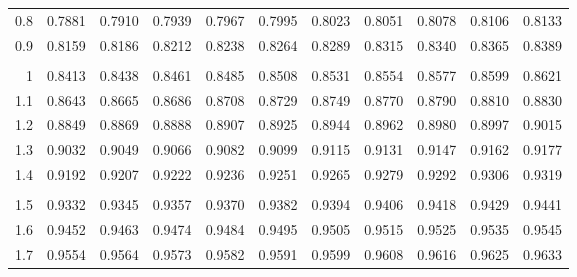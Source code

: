\begin{center}
\begin{tabular}{r|rrrrrrrrrr}
       0.8 &     0.7881 &     0.7910 &     0.7939 &     0.7967 &     0.7995 &     0.8023 &     0.8051 &     0.8078 &     0.8106 &     0.8133 \\

       0.9 &     0.8159 &     0.8186 &     0.8212 &     0.8238 &     0.8264 &     0.8289 &     0.8315 &     0.8340 &     0.8365 &     0.8389 \\

           &            &            &            &            &            &            &            &            &            &            \\

         1 &     0.8413 &     0.8438 &     0.8461 &     0.8485 &     0.8508 &     0.8531 &     0.8554 &     0.8577 &     0.8599 &     0.8621 \\

       1.1 &     0.8643 &     0.8665 &     0.8686 &     0.8708 &     0.8729 &     0.8749 &     0.8770 &     0.8790 &     0.8810 &     0.8830 \\

       1.2 &     0.8849 &     0.8869 &     0.8888 &     0.8907 &     0.8925 &     0.8944 &     0.8962 &     0.8980 &     0.8997 &     0.9015 \\

       1.3 &     0.9032 &     0.9049 &     0.9066 &     0.9082 &     0.9099 &     0.9115 &     0.9131 &     0.9147 &     0.9162 &     0.9177 \\

       1.4 &     0.9192 &     0.9207 &     0.9222 &     0.9236 &     0.9251 &     0.9265 &     0.9279 &     0.9292 &     0.9306 &     0.9319 \\

           &            &            &            &            &            &            &            &            &            &            \\

       1.5 &     0.9332 &     0.9345 &     0.9357 &     0.9370 &     0.9382 &     0.9394 &     0.9406 &     0.9418 &     0.9429 &     0.9441 \\

       1.6 &     0.9452 &     0.9463 &     0.9474 &     0.9484 &     0.9495 &     0.9505 &     0.9515 &     0.9525 &     0.9535 &     0.9545 \\

       1.7 &     0.9554 &     0.9564 &     0.9573 &     0.9582 &     0.9591 &     0.9599 &     0.9608 &     0.9616 &     0.9625 &     0.9633 \\


\end{tabular}
\end{center}

